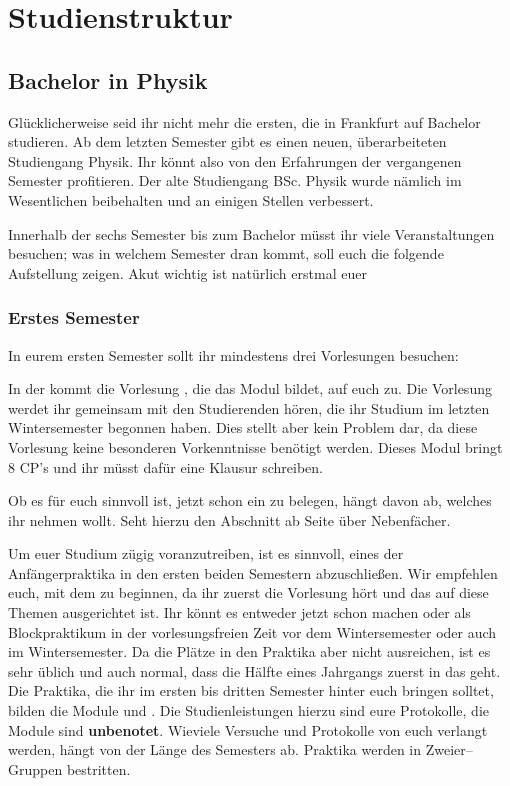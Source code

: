\section{Studienstruktur}

\subsection{Bachelor in Physik}
\bigskip
%
Glücklicherweise seid ihr nicht mehr die ersten, die in Frankfurt auf Bachelor studieren.
Ab dem letzten Semester gibt es einen neuen, überarbeiteten Studiengang Physik.
Ihr könnt also von den Erfahrungen der vergangenen Semester profitieren.
Der alte Studiengang BSc. Physik wurde nämlich im Wesentlichen beibehalten und an einigen Stellen verbessert.
\bigskip

Innerhalb der sechs Semester bis zum Bachelor müsst ihr viele Veranstaltungen besuchen; was in welchem Semester dran kommt, soll
euch die folgende Aufstellung zeigen. Akut wichtig ist natürlich erstmal euer


\subsubsection{Erstes Semester}
In eurem ersten Semester sollt ihr mindestens drei Vorlesungen besuchen:
\bigskip

In der  kommt die Vorlesung ,
die das Modul  bildet, auf euch zu.
Die Vorlesung werdet ihr gemeinsam mit den Studierenden hören, die ihr Studium im letzten Wintersemester begonnen haben.
Dies stellt aber kein Problem dar, da diese Vorlesung keine besonderen Vorkenntnisse benötigt werden.
Dieses Modul bringt 8 CP's und ihr müsst dafür eine Klausur schreiben.
\bigskip

Ob es für euch sinnvoll ist, jetzt schon ein  zu belegen,
hängt davon ab, welches ihr nehmen wollt.
Seht hierzu den Abschnitt ab Seite \pageref{Nebenfach} über Nebenfächer.
\bigskip

Um euer Studium zügig voranzutreiben, ist es sinnvoll, eines der Anfängerpraktika in den ersten beiden Semestern abzuschließen.
Wir empfehlen euch, mit dem  zu beginnen, da ihr zuerst die Vorlesung  hört und das  auf diese Themen ausgerichtet ist. Ihr könnt es entweder jetzt schon machen oder als Blockpraktikum in der vorlesungsfreien Zeit vor dem Wintersemester oder auch im Wintersemester. Da die Plätze in den Praktika aber nicht ausreichen, ist es sehr üblich und auch normal,
dass die Hälfte eines Jahrgangs zuerst in das  geht. Die Praktika, die ihr im ersten bis dritten Semester hinter euch bringen solltet, bilden die Module  und . Die Studienleistungen hierzu sind eure Protokolle, die Module sind \textbf{unbenotet}.
Wieviele Versuche und Protokolle von euch verlangt werden, hängt von der Länge des Semesters ab.
Praktika werden in Zweier--Gruppen bestritten.

